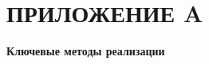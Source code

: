 \section*{ПРИЛОЖЕНИЕ A}\label{sec:app-A}
\begin{center}
	\textbf{Ключевые методы реализации}
\end{center}
